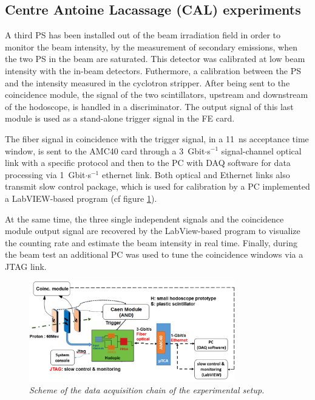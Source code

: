 \documentclass[a4paper,11pt]{article}
\begin{document}
\subsection{Centre Antoine Lacassage (CAL) experiments}
\label{In-beam_tests}

A third PS has been installed out of the beam irradiation field in order to monitor the beam intensity, by the measurement of secondary emissions, when the two PS in the beam are saturated. This detector was calibrated at low beam intensity with the in-beam detectors. Futhermore, a calibration between the PS and the intensity measured in the cyclotron stripper. After being sent to the coincidence module, the signal of the two scintillators, upstream and downstream of the hodoscope, is handled in a discriminator. The output signal of this last module is used as a stand-alone trigger signal in the FE card. 

The fiber signal in coincidence with the trigger signal, in a 11~ns acceptance time window, is sent to the AMC40 card through a 3~Gbit$\cdot$s$^{-1}$ signal-channel optical link with a specific protocol and then to the PC with DAQ software for data processing via 1~Gbit$\cdot$s$^{-1}$ ethernet link. Both optical and Ethernet links also transmit slow control package, which is used for calibration by a PC implemented a LabVIEW-based program (cf figure \ref{fig:Scheme_Setup_hodo}). 

At the same time, the three single independent signals and the coincidence module output signal are recovered by the LabView-based program to visualize the counting rate and estimate the beam intensity in real time.
Finally, during the beam test an additional PC was used to tune the coincidence windows via a JTAG link.

\begin{figure}[htb]
\centering
\includegraphics[width=0.8\textwidth]{figures/Scheme_Setup_Nice_08_2019.pdf}
\caption{\small{\textit{Scheme of the data acquisition chain of the experimental setup.}}}
\label{fig:Scheme_Setup_hodo}
\end{figure}
\end{document}
